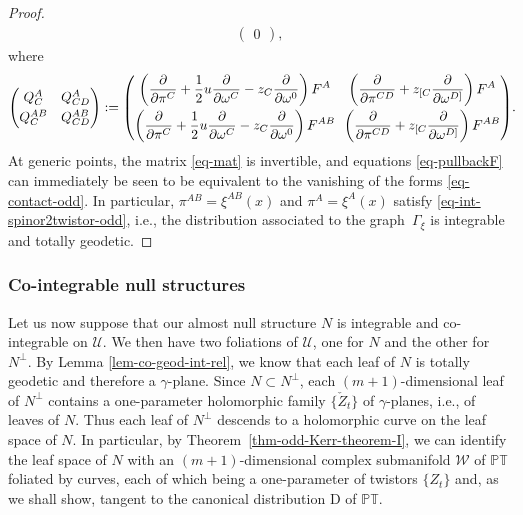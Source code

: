 \documentclass[10pt,a4paper]{amsart}
\numberwithin{equation}{section}
\newcommand{\parderv}[2] {\frac{\partial#1}{\partial#2}}
\newcommand{\mc} [1]{\mathcal{#1}}
\newcommand{\PT} {\mathbb{PT}}
\begin{document}
\begin{proof}
\begin{gather}
\begin{pmatrix}
0
\end{pmatrix} ,
\end{gather}
where
\begin{gather}\label{eq-mat}
\begin{pmatrix}
Q_C^A & Q_{CD}^A \vspace{1mm}\\
Q_C^{AB} & Q_{CD}^{AB}
\end{pmatrix} :=
\begin{pmatrix}
\displaystyle \left( \parderv{}{\pi^{C}} + \frac{1}{2} u \parderv{}{\omega^{C}} - z_{C} \parderv{}{\omega^0} \right) F^{A}\!\! & \displaystyle\left( \parderv{}{\pi^{CD}} + z_{[C} \parderv{}{\omega^{D]}} \right) F^{A} \vspace{1mm}\\
\displaystyle\left( \parderv{}{\pi^{C}} + \frac{1}{2} u \parderv{}{\omega^{C}} - z_{C} \parderv{}{\omega^0} \right) F^{AB}\!\! & \displaystyle\left( \parderv{}{\pi^{CD}} + z_{[C} \parderv{}{\omega^{D]}} \right) F^{AB}
\end{pmatrix}\! .\!\!
\end{gather}
At generic points, the matrix \eqref{eq-mat} is invertible, and equations \eqref{eq-pullbackF} can immediately be seen to be equivalent to the vanishing of the forms \eqref{eq-contact-odd}. In particular, $\pi^{AB} = \xi^{AB}(x)$ and \mbox{$\pi^{A} = \xi^A(x)$} satisfy \eqref{eq-int-spinor2twistor-odd}, i.e., the distribution associated to the graph~$\Gamma_{\xi}$ is integrable and totally geo\-detic.
\end{proof}


\subsubsection{Co-integrable null structures}
Let us now suppose that our almost null structure $N$ is integrable and co-integrable on $\mc{U}$. We then have two foliations of $\mc{U}$, one for $N$ and the other for $N^\perp$. By Lemma \ref{lem-co-geod-int-rel}, we know that each leaf of $N$ is totally geodetic and therefore a $\gamma$-plane. Since $N \subset N^\perp$, each $(m+1)$-dimensional leaf of $N^\perp$ contains a one-parameter holomorphic family $\{ \check{Z}_t \}$ of $\gamma$-planes, i.e., of leaves of $N$. Thus each leaf of $N^\perp$ descends to a holomorphic curve on the leaf space of $N$. In particular, by Theorem~\ref{thm-odd-Kerr-theorem-I}, we can identify the leaf space of $N$ with an $(m+1)$-dimensional complex submanifold $\mc{W}$ of $\PT$ foliated by curves, each of which being a one-parameter of twistors $\{ Z_t \}$ and, as we shall show, tangent to the canonical distribution $\mathrm{D}$ of $\PT$.
\end{document}
